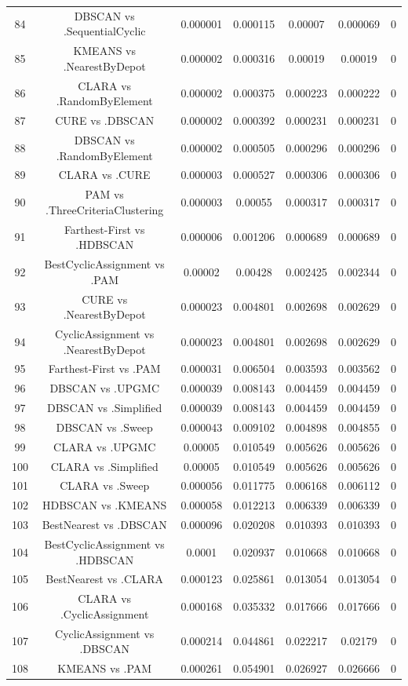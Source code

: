 \documentclass[a4paper,10pt]{article}
\begin{document}
\begin{landscape}
\begin{table}[!htp]
\begin{tabular}{ccccccc}
84&DBSCAN vs .SequentialCyclic&0.000001&0.000115&0.00007&0.000069&0\\
85&KMEANS vs .NearestByDepot&0.000002&0.000316&0.00019&0.00019&0\\
86&CLARA vs .RandomByElement&0.000002&0.000375&0.000223&0.000222&0\\
87&CURE vs .DBSCAN&0.000002&0.000392&0.000231&0.000231&0\\
88&DBSCAN vs .RandomByElement&0.000002&0.000505&0.000296&0.000296&0\\
89&CLARA vs .CURE&0.000003&0.000527&0.000306&0.000306&0\\
90&PAM vs .ThreeCriteriaClustering&0.000003&0.00055&0.000317&0.000317&0\\
91&Farthest-First vs .HDBSCAN&0.000006&0.001206&0.000689&0.000689&0\\
92&BestCyclicAssignment vs .PAM&0.00002&0.00428&0.002425&0.002344&0\\
93&CURE vs .NearestByDepot&0.000023&0.004801&0.002698&0.002629&0\\
94&CyclicAssignment vs .NearestByDepot&0.000023&0.004801&0.002698&0.002629&0\\
95&Farthest-First vs .PAM&0.000031&0.006504&0.003593&0.003562&0\\
96&DBSCAN vs .UPGMC&0.000039&0.008143&0.004459&0.004459&0\\
97&DBSCAN vs .Simplified&0.000039&0.008143&0.004459&0.004459&0\\
98&DBSCAN vs .Sweep&0.000043&0.009102&0.004898&0.004855&0\\
99&CLARA vs .UPGMC&0.00005&0.010549&0.005626&0.005626&0\\
100&CLARA vs .Simplified&0.00005&0.010549&0.005626&0.005626&0\\
101&CLARA vs .Sweep&0.000056&0.011775&0.006168&0.006112&0\\
102&HDBSCAN vs .KMEANS&0.000058&0.012213&0.006339&0.006339&0\\
103&BestNearest vs .DBSCAN&0.000096&0.020208&0.010393&0.010393&0\\
104&BestCyclicAssignment vs .HDBSCAN&0.0001&0.020937&0.010668&0.010668&0\\
105&BestNearest vs .CLARA&0.000123&0.025861&0.013054&0.013054&0\\
106&CLARA vs .CyclicAssignment&0.000168&0.035332&0.017666&0.017666&0\\
107&CyclicAssignment vs .DBSCAN&0.000214&0.044861&0.022217&0.02179&0\\
108&KMEANS vs .PAM&0.000261&0.054901&0.026927&0.026666&0\\

\end{tabular}
\end{table}
\end{landscape}
\end{document}
